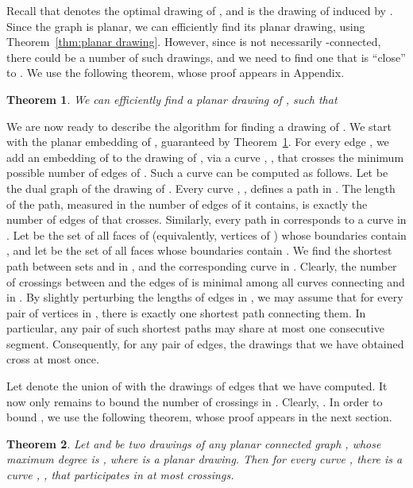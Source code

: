 \documentclass[twoside,leqno,twocolumn]{article}
\newtheorem{theorem}{Theorem}
\begin{document}
Recall that  denotes the optimal drawing of , and  is the drawing of  induced by .
Since the graph  is planar, we can efficiently find its planar drawing, using Theorem~\ref{thm:planar drawing}. However, since  is not necessarily -connected, there could be a number of such drawings, and we need to find one that is ``close'' to . 
We use the following theorem, whose proof appears in Appendix.
\begin{theorem}\label{thm: good planar drawing}
We can efficiently find a planar drawing  of , such that

\end{theorem}

We are now ready to describe the algorithm for finding a drawing of . We start with the planar embedding  of , guaranteed by Theorem~\ref{thm: good planar drawing}.
For every edge , we add an embedding of  to the drawing  of , via a curve , , that crosses the minimum possible number of edges of . Such a curve can be computed as follows.
Let  be the dual graph of the drawing  of . 
Every curve  , ,  
defines a path in .
The length of the path, measured in the number of edges of  it contains, is exactly the number of edges of  that  crosses.
Similarly, every path in  corresponds to a curve in .
Let  be the set of all faces of  (equivalently, vertices of ) whose boundaries contain , and
let  be the set of all faces whose boundaries contain . 
We find the shortest path  between sets  and  in ,
and the corresponding curve  in .
Clearly, the number of crossings between  and the edges of  is 
minimal among all curves connecting  and  in . 
By slightly perturbing the lengths of edges in , we may
assume that for every pair of vertices in , there is exactly one shortest path connecting them. In particular, any pair of such shortest paths may share at most one consecutive segment.
Consequently, for any pair  of edges, the drawings  that we have obtained cross at most once.

Let  denote the union of  with the drawings  of edges  that we have computed. It now only remains to bound the number of crossings in . Clearly, . In order to bound , we use the following theorem, whose proof appears in the next section.

 
\begin{theorem}\label{thm:main-along-path}
Let  and  be two drawings of any planar connected graph , whose maximum degree is , where  is a planar drawing.
Then for every curve , 
there is a  curve , ,
that participates in at most  crossings.
\end{theorem}
\end{document}
